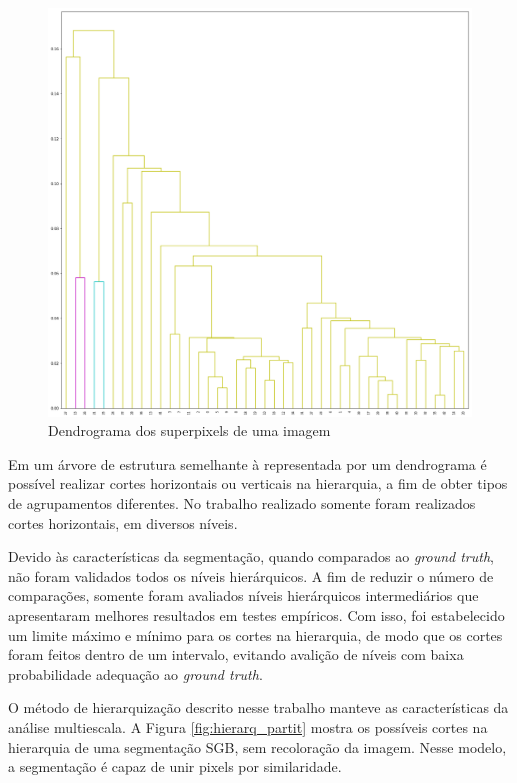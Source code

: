 \begin{document}
\begin{figure}[ht]
\centering
\includegraphics[width=1.\textwidth]{dendrogram.png}
\caption{Dendrograma dos superpixels de uma imagem}
\label{fig:DENDROGRAM}
\end{figure}

Em um árvore de estrutura semelhante à representada por um dendrograma é possível realizar cortes horizontais ou verticais na hierarquia, a fim de obter tipos de agrupamentos diferentes. No trabalho realizado somente foram realizados cortes horizontais, em diversos níveis. 

Devido às características da segmentação, quando comparados ao \textit{ground truth}, não foram validados todos os níveis hierárquicos. A fim de reduzir o número de comparações, somente foram avaliados níveis hierárquicos intermediários que apresentaram melhores resultados em testes empíricos. Com isso, foi estabelecido um limite máximo e mínimo para os cortes na hierarquia, de modo que os cortes foram feitos dentro de um intervalo, evitando avalição de níveis com baixa probabilidade adequação ao \textit{ground truth}.

O método de hierarquização descrito nesse trabalho manteve as características da análise multiescala. A Figura \ref{fig:hierarq_partit} mostra os possíveis cortes na hierarquia de uma segmentação SGB, sem recoloração da imagem. Nesse modelo, a segmentação é capaz de unir pixels por similaridade.
\end{document}
